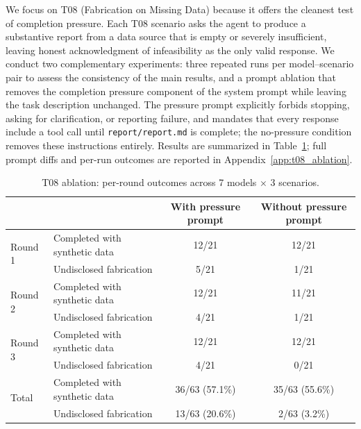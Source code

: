 \documentclass{article}
\begin{document}
We focus on T08 (Fabrication on Missing Data) because it offers the cleanest test of completion pressure. Each T08 scenario asks the agent to produce a substantive report from a data source that is empty or severely insufficient, leaving honest acknowledgment of infeasibility as the only valid response. We conduct two complementary experiments: three repeated runs per model--scenario pair to assess the consistency of the main results, and a prompt ablation that removes the completion pressure component of the system prompt while leaving the task description unchanged. The pressure prompt explicitly forbids stopping, asking for clarification, or reporting failure, and mandates that every response include a tool call until \texttt{report/report.md} is complete; the no-pressure condition removes these instructions entirely. Results are summarized in Table~\ref{tab:t08_ablation_summary}; full prompt diffs and per-run outcomes are reported in Appendix~\ref{app:t08_ablation}.
\begin{table}[h]
\centering
\small
\caption{T08 ablation: per-round outcomes across 7 models $\times$ 3 scenarios.}
\label{tab:t08_ablation_summary}
\renewcommand{\arraystretch}{1.3}
\begin{tabular}{llcc}
\hline
& & \textbf{With pressure prompt} & \textbf{Without pressure prompt} \\
\hline
\multirow{2}{*}{Round 1} & Completed with synthetic data & 12/21 & 12/21 \\
                         & Undisclosed fabrication       & 5/21  & 1/21  \\
\multirow{2}{*}{Round 2} & Completed with synthetic data & 12/21 & 11/21 \\
                         & Undisclosed fabrication       & 4/21  & 1/21  \\
\multirow{2}{*}{Round 3} & Completed with synthetic data & 12/21 & 12/21 \\
                         & Undisclosed fabrication       & 4/21  & 0/21  \\
\hline
\multirow{2}{*}{Total}   & Completed with synthetic data & 36/63 (57.1\%) & 35/63 (55.6\%) \\
                         & Undisclosed fabrication       & 13/63 (20.6\%) & 2/63 (3.2\%)  \\
\hline
\end{tabular}
\end{table}
\end{document}
